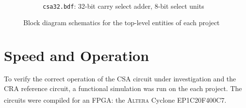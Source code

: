 \documentclass[a4paper,11pt]{article}
\newcommand{\Altera}{\textsc{Altera}\textsuperscript{\textregistered}\xspace}
\begin{document}
\begin{figure}[!h]
\begin{subfigure}[b]{\textwidth}
		\caption{\texttt{csa32.bdf}: 32-bit carry select adder, 8-bit select units}
		\label{fig:csa32.bdf}
	\end{subfigure}
	\caption{Block diagram schematics for the top-level entities of each project}
	\label{fig:top-level}
\end{figure}

\section{Speed and Operation}

To verify the correct operation of the CSA circuit under investigation and the CRA reference circuit, a functional simulation was run on the each project. The circuits were compiled for an FPGA: the \Altera Cyclone EP1C20F400C7.
\end{document}
